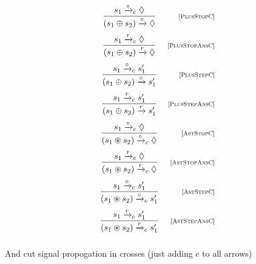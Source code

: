   \[
  \begin{array}{cr}
    \dfrac{s_1 \xrightarrow{\circ}_c \Diamond}{(s_1 \oplus s_2) \xrightarrow{\circ} \Diamond} & \mbox{\scriptsize{[\textsc{PlusStopC}]}}\\[5mm]
    \dfrac{s_1 \xrightarrow{r}_c \Diamond}{(s_1 \oplus s_2) \xrightarrow{r} \Diamond} & \mbox{\scriptsize{[\textsc{PlusStopAnsC}]}}\\[5mm]
    \dfrac{s_1 \xrightarrow{\circ}_c s'_1}{(s_1 \oplus s_2) \xrightarrow{\circ} s'_1} &\mbox{\scriptsize{[\textsc{PlusStepC}]}}\\[5mm]
    \dfrac{s_1 \xrightarrow{r}_c s'_1}{(s_1 \oplus s_2) \xrightarrow{r} s'_1} &\mbox{\scriptsize{[\textsc{PlusStepAnsC}]}}\\[5mm]
    \dfrac{s_1 \xrightarrow{\circ}_c \Diamond}{(s_1 \circledast s_2) \xrightarrow{\circ}_c \Diamond} & \mbox{\scriptsize{[\textsc{AstStopC}]}}\\[5mm]
    \dfrac{s_1 \xrightarrow{r}_c \Diamond}{(s_1 \circledast s_2) \xrightarrow{r}_c \Diamond} & \mbox{\scriptsize{[\textsc{AstStopAnsC}]}}\\[5mm]
    \dfrac{s_1 \xrightarrow{\circ}_c s'_1}{(s_1 \circledast s_2) \xrightarrow{\circ}_c s'_1} &\mbox{\scriptsize{[\textsc{AstStepC}]}}\\[5mm]
    \dfrac{s_1 \xrightarrow{r}_c s'_1}{(s_1 \circledast s_2) \xrightarrow{r}_c s'_1} &\mbox{\scriptsize{[\textsc{AstStepAnsC}]}}\\[5mm]
  \end{array}
  \]
  
And cut signal propogation in crosses (just adding $c$ to all arrows)
